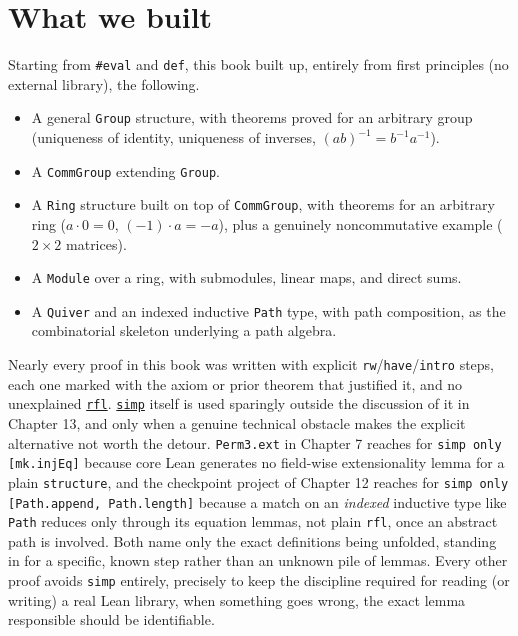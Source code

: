 \section{What we built}\label{sec:14-next-steps:01-what-we-built:1}

Starting from \texttt{\#eval} and \texttt{def}, this book built up, entirely from first principles (no external library), the following.

\begin{itemize}
\tightlist
\item
  A general \texttt{Group} structure, with theorems proved for an arbitrary group (uniqueness of identity, uniqueness of inverses, \((ab)^{-1} = b^{-1}a^{-1}\)).
\item
  A \texttt{CommGroup} extending \texttt{Group}.
\item
  A \texttt{Ring} structure built on top of \texttt{CommGroup}, with theorems for an arbitrary ring (\(a \cdot 0 = 0\), \((-1)\cdot a = -a\)), plus a genuinely noncommutative example (\(2\times 2\) matrices).
\item
  A \texttt{Module} over a ring, with submodules, linear maps, and direct sums.
\item
  A \texttt{Quiver} and an indexed inductive \texttt{Path} type, with path composition, as the combinatorial skeleton underlying a path algebra.
\end{itemize}

Nearly every proof in this book was written with explicit \texttt{rw}/\texttt{have}/\texttt{intro} steps, each one marked with the axiom or prior theorem that justified it, and no unexplained \href{https://lean-lang.org/doc/reference/latest/Tactic-Proofs/Tactic-Reference/}{\texttt{rfl}}. \href{https://lean-lang.org/doc/reference/latest/Tactic-Proofs/Tactic-Reference/}{\texttt{simp}} itself is used sparingly outside the discussion of it in Chapter 13, and only when a genuine technical obstacle makes the explicit alternative not worth the detour. \texttt{Perm3.ext} in Chapter 7 reaches for \texttt{simp only [mk.injEq]} because core Lean generates no field-wise extensionality lemma for a plain \texttt{structure}, and the checkpoint project of Chapter 12 reaches for \texttt{simp only [Path.append, Path.length]} because a match on an \emph{indexed} inductive type like \texttt{Path} reduces only through its equation lemmas, not plain \texttt{rfl}, once an abstract path is involved. Both name only the exact definitions being unfolded, standing in for a specific, known step rather than an unknown pile of lemmas. Every other proof avoids \texttt{simp} entirely, precisely to keep the discipline required for reading (or writing) a real Lean library, when something goes wrong, the exact lemma responsible should be identifiable.

